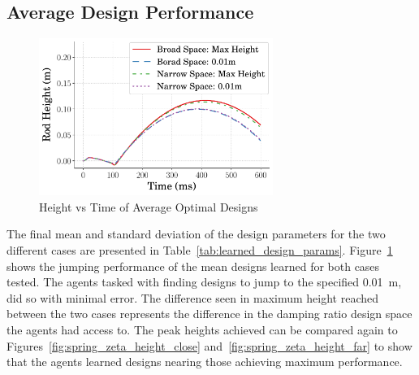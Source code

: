 \documentclass[letterpaper, 10 pt, conference]{ieeeconf}  %
\begin{document}
\subsection{Average Design Performance}
%
\begin{figure}[tb]
        \begin{center}
        \includegraphics[width = 3in]{figures/timeseries/TimeseriesHeight_2021-10-12_231714.pdf}  
        \caption{Height vs Time of Average Optimal Designs}
        \label{fig:height_vs_time}
        \end{center}
        \end{figure}

The final mean and standard deviation of the design parameters for the two different cases are presented in Table~\ref{tab:learned_design_params}. Figure~\ref{fig:height_vs_time} shows the jumping performance of the mean designs learned for both cases tested. The agents tasked with finding designs to jump to the specified 0.01~m, did so with minimal error. The difference seen in maximum height reached between the two cases represents the difference in the damping ratio design space the agents had access to. The peak heights achieved can be compared again to Figures~\ref{fig:spring_zeta_height_close} and~\ref{fig:spring_zeta_height_far} to show that the agents learned designs nearing those achieving maximum performance.
\end{document}
